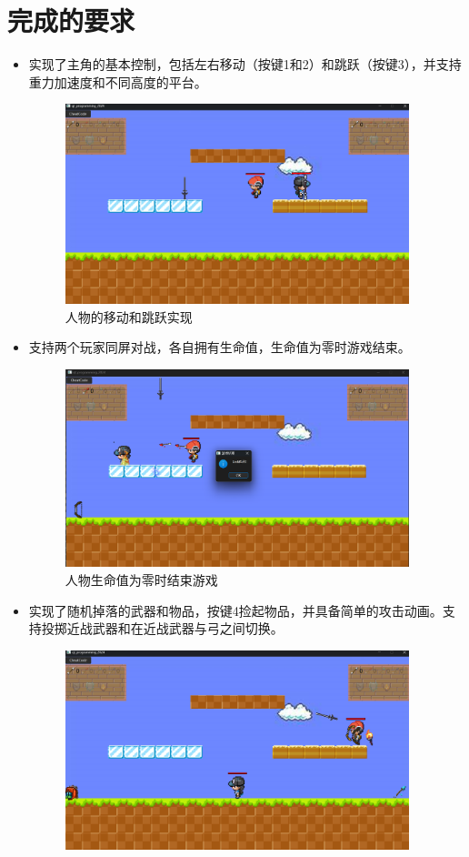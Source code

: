 \documentclass[UTF8]{ctexart}
\begin{document}
\section{完成的要求}
\begin{itemize}
    \item 实现了主角的基本控制，包括左右移动（按键1和2）和跳跃（按键3），并支持重力加速度和不同高度的平台。
    \begin{figure}[H]
        \centering
        \includegraphics[width=10cm]{image/screenshot_1.png}
        \caption{人物的移动和跳跃实现}
        \label{fig:screenshot_1}
    \end{figure}    
    \item 支持两个玩家同屏对战，各自拥有生命值，生命值为零时游戏结束。
    \begin{figure}[H]
        \centering
        \includegraphics[width=10cm]{image/screenshot_2.png}
        \caption{人物生命值为零时结束游戏}
        \label{fig:screenshot_2}
    \end{figure}
    \item 实现了随机掉落的武器和物品，按键4捡起物品，并具备简单的攻击动画。支持投掷近战武器和在近战武器与弓之间切换。
    \begin{figure}[H]
        \centering
        \includegraphics[width=10cm]{image/screenshot_3.png}

\end{figure}
\end{itemize}
\end{document}
